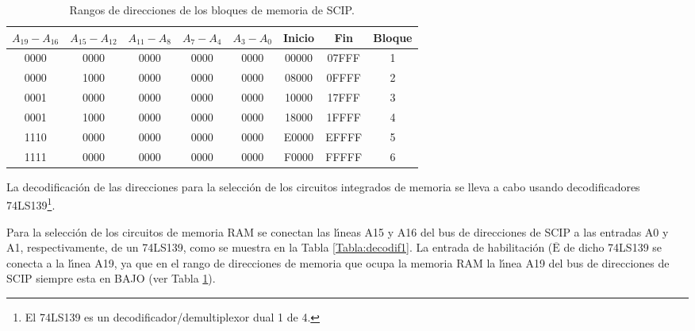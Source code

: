 \begin{table}[!htb]
\centering
\begin{tabular}{|c|c|c|c|c|c|c|c|} \hline
{\tiny $A_{19} - A_{16}$} & {\tiny $A_{15} - A_{12}$} & {\tiny $A_{11} - A_{8}$} & %
{\tiny $A_{7} - A_{4}$} & {\tiny $A_{3} - A_{0}$} & {\tiny Inicio} & {\tiny Fin} & %
{\tiny Bloque} \\ \hline \hline
{\footnotesize 0000} & {\footnotesize 0000} & {\footnotesize 0000} & %
{\footnotesize 0000} & {\footnotesize 0000} & {\footnotesize 00000} & %
{\footnotesize 07FFF} & {\footnotesize 1} \\ \hline
{\footnotesize 0000} & {\footnotesize 1000} & {\footnotesize 0000} & %
{\footnotesize 0000} & {\footnotesize 0000} & {\footnotesize 08000} & %
{\footnotesize 0FFFF} & {\footnotesize 2} \\ \hline
{\footnotesize 0001} & {\footnotesize 0000} & {\footnotesize 0000} & %
{\footnotesize 0000} & {\footnotesize 0000} & {\footnotesize 10000} & %
{\footnotesize 17FFF} & {\footnotesize 3} \\ \hline
{\footnotesize 0001} & {\footnotesize 1000} & {\footnotesize 0000} & %
{\footnotesize 0000} & {\footnotesize  0000} & {\footnotesize 18000} & %
{\footnotesize 1FFFF} & {\footnotesize 4} \\ \hline
{\footnotesize 1110} & {\footnotesize 0000} & {\footnotesize 0000} & %
{\footnotesize 0000} & {\footnotesize 0000} & {\footnotesize E0000} & %
{\footnotesize EFFFF} & {\footnotesize 5} \\ \hline
{\footnotesize 1111} & {\footnotesize 0000} & {\footnotesize 0000} & %
{\footnotesize 0000} & {\footnotesize 0000} & {\footnotesize F0000} & %
{\footnotesize FFFFF} & {\footnotesize 6} \\ \hline
\end{tabular}
\caption{Rangos de direcciones de los bloques de memoria de SCIP.}
\label{Tabla:decodifmem}
\end{table}

\vspace{12pt}

La decodificaci\'on de las direcciones para la selecci\'on de los circuitos integrados de %
memoria se lleva a cabo usando decodificadores 74LS139\footnote{El 74LS139 es un %
decodificador/demultiplexor dual 1 de 4.}. 

Para la selecci\'on de los circuitos de memoria RAM se conectan las l\'{\i}neas A15 y A16 del %
bus de direcciones de SCIP a las entradas A0 y A1, respectivamente, de un 74LS139, como se %
muestra en la Tabla \ref{Tabla:decodif1}. La entrada de habilitaci\'on %
($\overline{\mbox{E}}$ de dicho 74LS139 se conecta a la l\'{\i}nea A19, ya que en el rango %
de direcciones de memoria que ocupa la memoria RAM la l\'{\i}nea A19 del bus de direcciones de %
SCIP siempre esta en BAJO (ver Tabla \ref{Tabla:decodifmem}).

